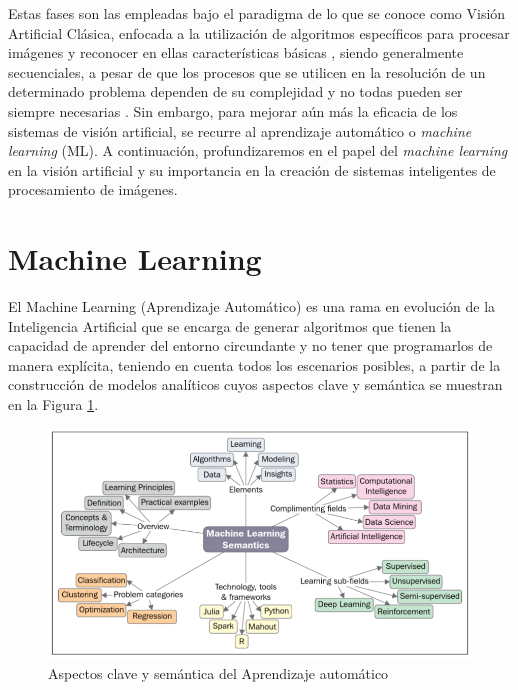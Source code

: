 Estas fases son las empleadas bajo el paradigma de lo que se conoce como Visión
Artificial Clásica, enfocada a la utilización de algoritmos específicos para procesar imágenes y reconocer en ellas características básicas \cite{Martinez22}, siendo generalmente secuenciales, a pesar de que los procesos que se utilicen en la resolución de un determinado problema dependen de su complejidad y no todas pueden ser siempre necesarias \cite{Santillan15}. Sin embargo, para mejorar aún más la eficacia de los sistemas de visión artificial, se recurre al aprendizaje automático o \textit{machine learning} (ML). A continuación, profundizaremos en el papel del \textit{machine learning} en la visión artificial y su importancia en la creación de sistemas inteligentes de procesamiento de imágenes. \\

\pagebreak

\section{Machine Learning}
\label{sec:MachineLearning} 

El Machine Learning (Aprendizaje Automático) es una rama en evolución de la Inteligencia Artificial que se encarga de generar algoritmos que tienen la capacidad de aprender del entorno circundante y no tener que programarlos de manera explícita, teniendo en cuenta todos los escenarios posibles, a partir de la construcción de modelos analíticos \cite{Sandoval18} cuyos aspectos clave y semántica se muestran en la Figura \ref{fig:ML semantics}.

 \begin{figure} [h!]
    \begin{center}
      \includegraphics[width=12cm]{figs/ML semantics.png}
    \end{center}
    \caption{Aspectos clave y semántica del Aprendizaje automático}
    \label{fig:ML semantics}
\end{figure}


